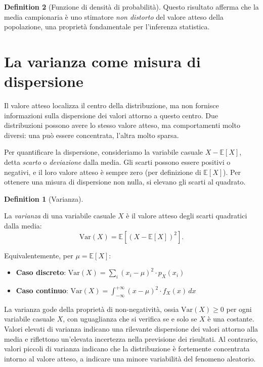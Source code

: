 \documentclass[
  letterpaper,
  DIV=11,
  numbers=noendperiod,
  oneside]{scrreprt}
\providecommand{\tightlist}{%
  \setlength{\itemsep}{0pt}\setlength{\parskip}{0pt}}
\theoremstyle{definition}
\theoremstyle{plain}
\theoremstyle{definition}
\newtheorem{definition}{Definition}[chapter]
\theoremstyle{remark}
\begin{document}
\begin{definition}[Funzione di densità di
probabilità]
Questo risultato afferma che la media campionaria è uno stimatore
\emph{non distorto} del valore atteso della popolazione, una proprietà
fondamentale per l'inferenza statistica.

\section{La varianza come misura di
dispersione}\label{la-varianza-come-misura-di-dispersione}

Il valore atteso localizza il centro della distribuzione, ma non
fornisce informazioni sulla dispersione dei valori attorno a questo
centro. Due distribuzioni possono avere lo stesso valore atteso, ma
comportamenti molto diversi: una può essere concentrata, l'altra molto
sparsa.

Per quantificare la dispersione, consideriamo la variabile casuale
\(X - \mathbb{E}[X]\), detta \emph{scarto} o \emph{deviazione} dalla
media. Gli scarti possono essere positivi o negativi, e il loro valore
atteso è sempre zero (per definizione di \(\mathbb{E}[X]\)). Per
ottenere una misura di dispersione non nulla, si elevano gli scarti al
quadrato.

\begin{definition}[Varianza]\protect\hypertarget{def-}{}\label{def-}

La \emph{varianza} di una variabile casuale \(X\) è il valore atteso
degli scarti quadratici dalla media: \[
\text{Var}(X) = \mathbb{E}\left[(X - \mathbb{E}[X])^2\right].
\]

Equivalentemente, per \(\mu = \mathbb{E}[X]\):

\begin{itemize}
\tightlist
\item
  \textbf{Caso discreto}:
  \(\text{Var}(X) = \sum_i (x_i - \mu)^2 \cdot p_X(x_i)\)
\item
  \textbf{Caso continuo}:
  \(\text{Var}(X) = \int_{-\infty}^{+\infty} (x - \mu)^2 \cdot f_X(x) \, dx\)
\end{itemize}

\end{definition}

La varianza gode della proprietà di non-negatività, ossia
\(\text{Var}(X) \geq 0\) per ogni variabile casuale \(X\), con
uguaglianza che si verifica se e solo se \(X\) è una costante. Valori
elevati di varianza indicano una rilevante dispersione dei valori
attorno alla media e riflettono un'elevata incertezza nella previsione
dei risultati. Al contrario, valori piccoli di varianza indicano che la
distribuzione è fortemente concentrata intorno al valore atteso, a
indicare una minore variabilità del fenomeno aleatorio.


\end{definition}
\end{document}
